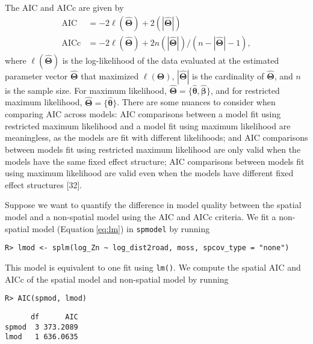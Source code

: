 \documentclass[10pt,letterpaper]{article}
\begin{document}
The AIC and AICc are given by \begin{equation*}\label{eq:sp_aic}
  \begin{split}
    \text{AIC} & = -2\ell(\hat{\boldsymbol{\Theta}}) + 2(|\hat{\boldsymbol{\Theta}}|) \\
    \text{AICc} & = -2\ell(\hat{\boldsymbol{\Theta}}) + 2n(|\hat{\boldsymbol{\Theta}}|) / (n - |\hat{\boldsymbol{\Theta}}| - 1),
  \end{split}
\end{equation*} where \(\ell(\hat{\boldsymbol{\Theta}})\) is the
log-likelihood of the data evaluated at the estimated parameter vector
\(\hat{\boldsymbol{\Theta}}\) that maximized
\(\ell(\boldsymbol{\Theta})\), \(|\hat{\boldsymbol{\Theta}}|\) is the
cardinality of \(\hat{\boldsymbol{\Theta}}\), and \(n\) is the sample
size. For maximum likelihood,
\(\hat{\boldsymbol{\Theta}} = \{\hat{\boldsymbol{\theta}}, \hat{\boldsymbol{\beta}}\}\),
and for restricted maximum likelihood,
\(\hat{\boldsymbol{\Theta}} = \{\hat{\boldsymbol{\theta}}\}\). There are
some nuances to consider when comparing AIC across models: AIC
comparisons between a model fit using restricted maximum likelihood and
a model fit using maximum likelihood are meaningless, as the models are
fit with different likelihoods; and AIC comparisons between models fit
using restricted maximum likelihood are only valid when the models have
the same fixed effect structure; AIC comparisons between models fit
using maximum likelihood are valid even when the models have different
fixed effect structures {[}32{]}.

Suppose we want to quantify the difference in model quality between the
spatial model and a non-spatial model using the AIC and AICc criteria.
We fit a non-spatial model (Equation\(~\)\ref{eq:lm}) in
\texttt{spmodel} by running

\begin{verbatim}
R> lmod <- splm(log_Zn ~ log_dist2road, moss, spcov_type = "none")
\end{verbatim}

\noindent This model is equivalent to one fit using \texttt{lm()}. We
compute the spatial AIC and AICc of the spatial model and non-spatial
model by running

\begin{verbatim}
R> AIC(spmod, lmod)
\end{verbatim}

\begin{verbatim}
      df      AIC
spmod  3 373.2089
lmod   1 636.0635
\end{verbatim}
\end{document}
